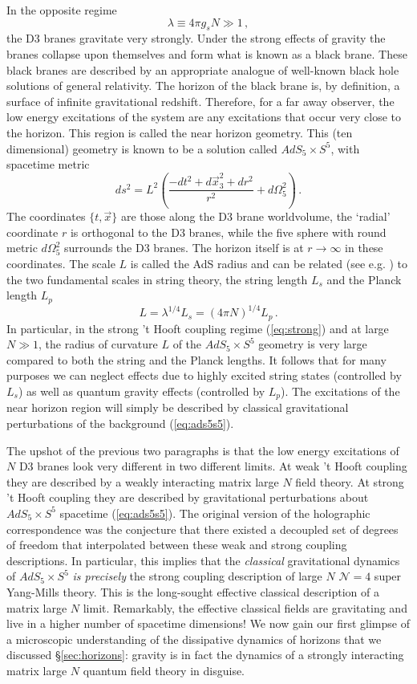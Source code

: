 \documentclass[10pt, oneside]{book}
\def\be{\begin{equation}}
\def\ee{\end{equation}}
\begin{document}
\begin{doublespace}
In the opposite regime
\be\label{eq:strong}
\lambda \equiv 4 \pi g_s N \gg 1 \,,
\ee
the D3 branes gravitate very strongly. Under the strong effects of gravity the branes collapse upon themselves and form what is known as a black brane. These black branes are described by an appropriate analogue of well-known black hole solutions of general relativity. The horizon of the black brane is, by definition, a surface of infinite gravitational redshift. Therefore, for a far away observer, the low energy excitations of the system are any excitations that occur very close to the horizon. This region is called the near horizon geometry. This (ten dimensional) geometry is known to be a solution called $AdS_5 \times S^5$, with spacetime metric
\be\label{eq:ads5s5}
ds^2 = L^2 \left( \frac{-dt^2 + d\vec x^2_3 + dr^2}{r^2} + d\Omega^2_5 \right) \,.
\ee
The coordinates $\{t,\vec x\}$ are those along the D3 brane worldvolume, the `radial' coordinate $r$ is orthogonal to the D3 branes, while the five sphere with round metric $d\Omega^2_5$ surrounds the D3 branes. The horizon itself is at $r \to \infty$ in these coordinates. The scale $L$ is called the AdS radius and can be related (see e.g. \cite{Maldacena:2011ut}) to the two fundamental scales in string theory, the string length $L_s$ and the Planck length $L_p$
\be\label{eq:stringy}
L = \lambda^{1/4} L_s = (4 \pi N)^{1/4} L_p \,.
\ee
In particular, in the strong 't Hooft coupling regime (\ref{eq:strong}) and at large $N \gg 1$, the radius of curvature $L$ of the $AdS_5 \times S^5$ geometry is very large compared to both the string and the Planck lengths. It follows that for many purposes we can neglect effects due to highly excited string states (controlled by $L_s$) as well as quantum gravity effects (controlled by $L_p$). The excitations of the near horizon region will simply be described by classical gravitational perturbations of the background (\ref{eq:ads5s5}).

The upshot of the previous two paragraphs is that the low energy excitations of $N$ D3 branes look very different in two different limits. At weak 't Hooft coupling they are described by a weakly interacting matrix large $N$ field theory. At strong 't Hooft coupling they are described by gravitational perturbations about $AdS_5 \times S^5$ spacetime (\ref{eq:ads5s5}). The original version of the holographic correspondence \cite{Maldacena:1997re} was the conjecture that there existed a decoupled set of degrees of freedom that interpolated between these weak and strong coupling descriptions. In particular, this implies that the {\it classical} gravitational dynamics of $AdS_5 \times S^5$ {\it is precisely} the strong coupling description of large $N$ ${\mathcal N} = 4$ super Yang-Mills theory. This is the long-sought effective classical description of a matrix large $N$ limit. Remarkably, the effective classical fields are gravitating and live in a higher number of spacetime dimensions! We now gain our first glimpse of a microscopic understanding of the dissipative dynamics of horizons that we discussed \S \ref{sec:horizons}: gravity is in fact the dynamics of a strongly interacting matrix large $N$ quantum field theory in disguise.


\end{doublespace}
\end{document}
